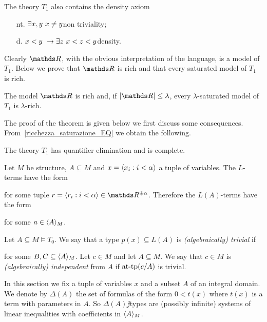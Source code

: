\documentclass[creche.tex]{subfiles}
\begin{document}
The theory \emph{$T_1$\/} also contains the density axiom 

\begin{itemize}
\item[nt.]$\exists x,y\ x\neq y$\hfill non triviality;
\item[d.] $x<y\ \imp \E z\ x<z<y$\hfill density.
\end{itemize}

Clearly $\RR$, with the obvious interpretation of the language, is a model of $T_1$. Below we prove that $\RR$ is rich and that every saturated model of $T_1$ is rich.

\begin{theorem}
The model $\RR$ is rich and, if $|\RR|\le\lambda$, every $\lambda$-saturated model of $T_1$ is $\lambda$-rich.
\end{theorem}



The proof of the theorem is given below we first discuss some consequences. From~\ref{ricchezza_saturazione_EQ} we obtain the following.

\begin{corollary}
The theory $T_1$ has quantifier elimination and is complete.
\end{corollary}

Let $M$ be structure, $A\subseteq M$ and $x=\langle x_i:i<\alpha\rangle$ a tuple of variables. The $L$-terms have the form 


for some tuple $r=\<r_i:i<\alpha\>\in\RR^{\oplus\alpha}$. Therefore the $L(A)$-terms have the form 


for some $a\in\langle A\rangle_M$. 

Let $A\subseteq M\models T_0$. We say that a type $p(x)\subseteq L(A)$ is \emph{(algebraically) trivial\/} if 


for some $B,C\subseteq\langle A\rangle_M$. Let $c\in M$ and let $A\subseteq M$. We say that $c\in M$ is \emph{(algebraically) independent\/} from $A$ if $\textrm{at\mbox{-}tp}(c/A)$ is trivial.  


In this section we fix a tuple of variables \emph{$x$\/} and a subset \emph{$A$} of an integral domain. We denote by \emph{$\Delta(A)$\/} the set of formulas of the form $0<t(x)$ where $t(x)$ is a term with parameters in $A$. So $\Delta(A)\jj$types are (possibly infinite) systems of linear inequalities with coefficients in $\langle A\rangle_M$. 
\end{document}
